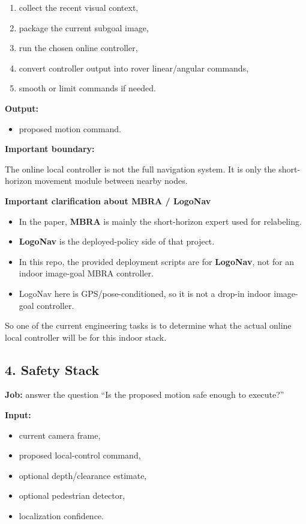 \documentclass[11pt,a4paper]{article}
\begin{document}
\begin{enumerate}[nosep]
  \item collect the recent visual context,
  \item package the current subgoal image,
  \item run the chosen online controller,
  \item convert controller output into rover linear/angular commands,
  \item smooth or limit commands if needed.
\end{enumerate}

\textbf{Output:}

\begin{itemize}[nosep]
  \item proposed motion command.
\end{itemize}

\textbf{Important boundary:}

The online local controller is not the full navigation system.
It is only the short-horizon movement module between nearby nodes.

\textbf{Important clarification about MBRA / LogoNav}

\begin{itemize}[nosep]
  \item In the paper, \textbf{MBRA} is mainly the short-horizon expert used for relabeling.
  \item \textbf{LogoNav} is the deployed-policy side of that project.
  \item In this repo, the provided deployment scripts are for \textbf{LogoNav}, not for an indoor image-goal MBRA controller.
  \item LogoNav here is GPS/pose-conditioned, so it is not a drop-in indoor image-goal controller.
\end{itemize}

So one of the current engineering tasks is to determine what the actual online
local controller will be for this indoor stack.


\subsection{4. Safety Stack}

\textbf{Job:} answer the question ``Is the proposed motion safe enough to execute?''

\textbf{Input:}

\begin{itemize}[nosep]
  \item current camera frame,
  \item proposed local-control command,
  \item optional depth/clearance estimate,
  \item optional pedestrian detector,
  \item localization confidence.
\end{itemize}
\end{document}
